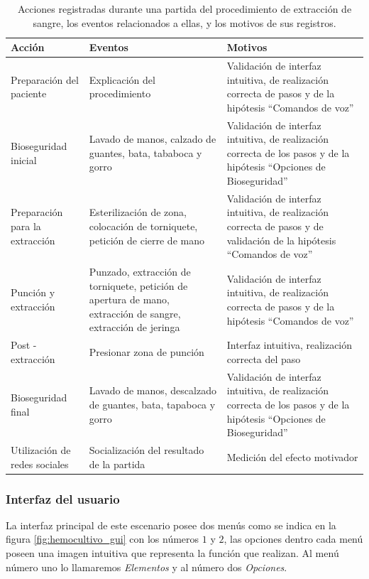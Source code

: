 \begin{table}[H]
\centering
\begin{tabulary}{\textwidth}{|L|L|L|}
\hline
Acción & Eventos & Motivos \\
\hline
Preparación del paciente & Explicación del procedimiento & Validación de interfaz intuitiva, 
de realización correcta de pasos y de la hipótesis \enquote{Comandos de voz} \\
\hline
Bioseguridad inicial  & Lavado de manos, calzado de guantes, bata, tababoca y gorro & Validación 
de interfaz intuitiva, de realización correcta de los pasos y de la hipótesis 
\enquote{Opciones de Bioseguridad} \\
\hline
Preparación para la extracción & Esterilización de zona, colocación de torniquete, petición de cierre de mano 
& Validación de interfaz intuitiva, de realización correcta de pasos y de validación de la hipótesis \enquote{Comandos de voz} \\
\hline
Punción y extracción & Punzado, extracción de torniquete, petición de apertura de mano, extracción de sangre, 
extracción de jeringa & Validación de interfaz intuitiva, de realización correcta de pasos y de la 
hipótesis \enquote{Comandos de voz} \\
\hline
Post - extracción & Presionar zona de punción & Interfaz intuitiva, realización correcta del paso \\
\hline
Bioseguridad final & Lavado de manos, descalzado de guantes, bata, tapaboca y gorro & Validación de interfaz intuitiva, de realización correcta de los pasos y de la hipótesis \enquote{Opciones de Bioseguridad} \\
\hline
Utilización de redes sociales & Socialización del resultado de la partida & Medición del efecto motivador\\
\hline
\end{tabulary}
\caption{Acciones registradas durante una partida del procedimiento de extracción de sangre, los eventos 
relacionados a ellas, y los motivos de sus registros.}
\label{tab:hemocultivo_registro}
\end{table}



\subsubsection{Interfaz del usuario}

La interfaz principal de este escenario posee dos menús como se indica en la figura 
\ref{fig:hemocultivo_gui} con los números $1$ y $2$, las opciones dentro cada menú poseen 
una imagen intuitiva que representa la función que realizan. Al menú número uno lo llamaremos 
\emph{Elementos} y al número dos \emph{Opciones}.

